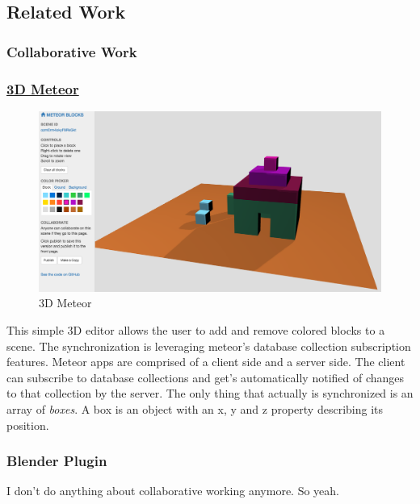 \subsection{Related Work}
\label{related-work}

\subsubsection{Collaborative Work}
\label{collaborative-work}

\subsubsection{\texorpdfstring{\href{http://3d.meteor.com/}{3D
Meteor}}{3D Meteor}}\label{d-meteor0}

\begin{figure}[htbp]
  \centering
  \includegraphics[width=12cm]{../assets/3dmeteor.png}
  \caption{3D Meteor}
	\label{fig:3dmeteor}
\end{figure}

This simple 3D editor allows the user to add and remove colored blocks
to a scene. The synchronization is leveraging meteor's database
collection subscription features. Meteor apps are comprised of a client
side and a server side. The client can subscribe to database collections
and get's automatically notified of changes to that collection by the
server. The only thing that actually is synchronized is an array of
\emph{boxes}. A box is an object with an x, y and z property describing
its position.

\subsubsection{Blender Plugin}
\label{blender-plugin}

I don't do anything about collaborative working anymore. So yeah.

